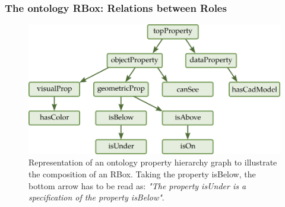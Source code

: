 \subsubsection{The ontology RBox: Relations between Roles}

\begin{figure}[h!]
\centering
\includegraphics[scale=0.4]{figures/chapter2/Rbox.png}
\caption{\label{fig:Rbox} Representation of an ontology property hierarchy graph to illustrate the composition of an RBox. Taking the property isBelow, the bottom arrow has to be read as: \textit{"The property isUnder is a specification of the property isBelow"}.}
\end{figure}

